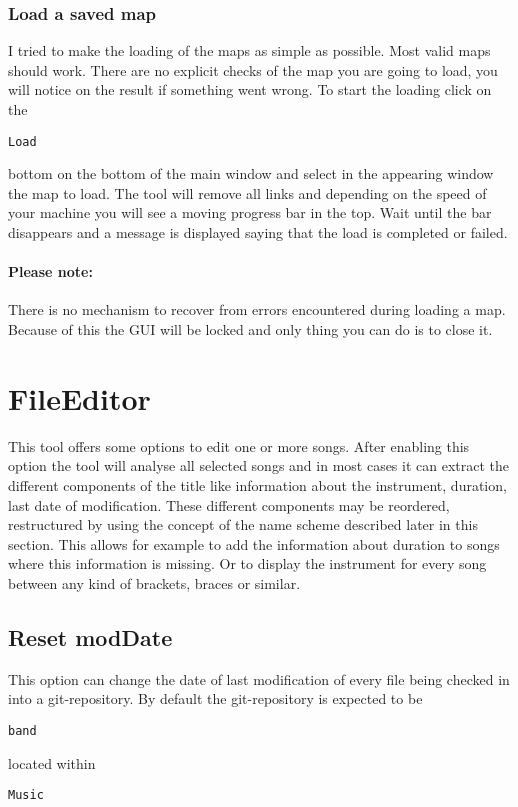 \documentclass[10pt,a4paper,oneside]{article}
\begin{document}
\subsubsection{Load a saved map}
I tried to  make the loading of the maps as simple as possible. Most valid maps should work. There are no explicit checks of the map you are going to load, you will notice on the result if something went wrong. To start the loading click on the
\begin{verbatim}
Load
\end{verbatim} bottom on the bottom of the main window and select in the appearing window the map to load. The tool will remove all links and depending on the speed of your machine you will see a moving progress bar in the top. Wait until the bar disappears and a message is displayed saying that the load is completed or failed.
\paragraph{Please note:} There is no mechanism to recover from errors encountered during loading a map. Because of this the GUI will be locked and only thing you can do is to close it.


\newpage
\section{FileEditor}
This tool offers some options to edit one or more songs. After enabling this option the tool will analyse all selected songs and in most cases it can extract the different components of the title like information about the instrument, duration, last date of modification. These different components may be reordered, restructured by using the concept of the name scheme described later in this section. This allows for example to add the information about duration to songs  where this information is missing. Or to display the instrument for every song between any kind of brackets, braces or similar.

\subsection{Reset modDate}
This option can change the date of last modification of every file being checked in into a git-repository. By default the git-repository is expected to be
\begin{verbatim}
band
\end{verbatim} located within
\begin{verbatim}
Music
\end{verbatim}
\end{document}

